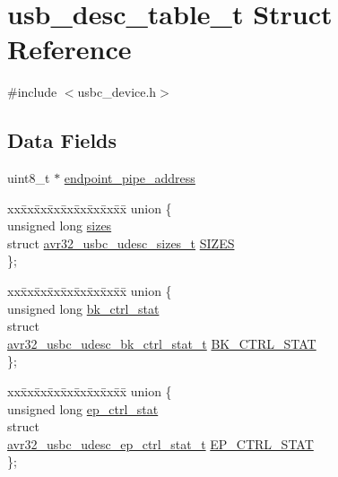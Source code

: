 \hypertarget{structusb__desc__table__t}{
\section{usb\-\_\-desc\-\_\-table\-\_\-t \-Struct \-Reference}
\label{structusb__desc__table__t}
}


{\ttfamily \#include $<$usbc\-\_\-device.\-h$>$}

\subsection*{\-Data \-Fields}
\begin{DoxyCompactItemize}
\item 
uint8\-\_\-t $\ast$ \hyperlink{structusb__desc__table__t_adf984d475f5ef6e64d92d73e06dd0505}{endpoint\-\_\-pipe\-\_\-address}
\item 
\begin{tabbing}
xx\=xx\=xx\=xx\=xx\=xx\=xx\=xx\=xx\=\kill
union \{\\
\>unsigned long \hyperlink{structusb__desc__table__t_ab8b9283572e5ec57f77e303040f50a5b}{sizes}\\
\>struct \hyperlink{structavr32__usbc__udesc__sizes__t}{avr32\_usbc\_udesc\_sizes\_t} \hyperlink{structusb__desc__table__t_a398c066ef26d68b2e4e7c699713d3aa3}{SIZES}\\
\}; \\

\end{tabbing}\item 
\begin{tabbing}
xx\=xx\=xx\=xx\=xx\=xx\=xx\=xx\=xx\=\kill
union \{\\
\>unsigned long \hyperlink{structusb__desc__table__t_a923739f1e7b42d66f71ac7a45e082245}{bk\_ctrl\_stat}\\
\>struct \\
\hyperlink{structavr32__usbc__udesc__bk__ctrl__stat__t}{avr32\_usbc\_udesc\_bk\_ctrl\_stat\_t} \hyperlink{structusb__desc__table__t_a6dad4df05ca7e1703d69b9a47a77122d}{BK\_CTRL\_STAT}\\
\}; \\

\end{tabbing}\item 
\begin{tabbing}
xx\=xx\=xx\=xx\=xx\=xx\=xx\=xx\=xx\=\kill
union \{\\
\>unsigned long \hyperlink{structusb__desc__table__t_a268ebfaba41abcb12540d375f78931c4}{ep\_ctrl\_stat}\\
\>struct \\
\hyperlink{structavr32__usbc__udesc__ep__ctrl__stat__t}{avr32\_usbc\_udesc\_ep\_ctrl\_stat\_t} \hyperlink{structusb__desc__table__t_a7d436bbfb39d6031f2a8a10030b81529}{EP\_CTRL\_STAT}\\
\}; \\

\end{tabbing}\end{DoxyCompactItemize}



